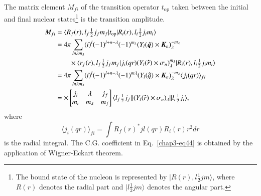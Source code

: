 The matrix element $M_{fi}$ of the transition operator $t_{\text{op}}$ taken between the initial and final nuclear states\footnote{The bound state of the nucleon is represented by $|R(r), l \tfrac{1}{2} jm \rangle$, where $R(r)$ denotes the radial part and $|l\tfrac{1}{2} jm \rangle$ denotes the angular part.} is the transition amplitude.
\begin{align}
  M_{fi} & = \langle R_f (r), l_f \tfrac{1}{2} j_f m_f| t_{\text{op}}| R_i (r) , l_i \tfrac{1}{2} j_i m_i \rangle \notag \\
  & = 4 \pi \sum_{ln\lambda m_\lambda} (i)^l (-1)^{l + n -\lambda} (-1)^{m_\lambda} (Y_l ({{\hat{\boldsymbol q}}}) \times {\boldsymbol K}_n)_{\lambda}^{-m_\lambda} \notag \\
  & \qquad \times \langle r_f (r), l_f \tfrac{1}{2} j_f m_f | j_i (qr) (Y_l ({\boldsymbol \hat{r}}) \times \sigma_n)_\lambda^{m_\lambda} |R_i (r), l_i \tfrac{1}{2} j_i m_i \rangle \notag \\
  & = 4\pi \sum_{ln \lambda m_\lambda} (i)^l (-1)^{l + n -\lambda} (-1)^{m \lambda} (Y_l({\boldsymbol \hat{q}})\times {\boldsymbol K}_n)^{-m_\lambda}_\lambda \langle j_l (qr)\rangle_{fi}\notag \\
  & = \times \begin{bmatrix} j_i & \lambda & j_f \\ m_i & m_\lambda & m_f \end{bmatrix}
  \langle l_f \tfrac{1}{2} j_f || (Y_l ({\boldsymbol \hat{r}}) \times \sigma_n)_\lambda|| l_i \tfrac{1}{2} j_i \rangle, \label{chap3-eq44}
\end{align}
where
$$
\langle j_i (qr)\rangle_{fi} = \int R_f (r)^\ast jl (qr) R_i (r) r^2 dr
$$
is the radial integral. The C.G. coefficient in Eq.\ \eqref{chap3-eq44} is obtained by the application of Wigner-Eckart theorem.

